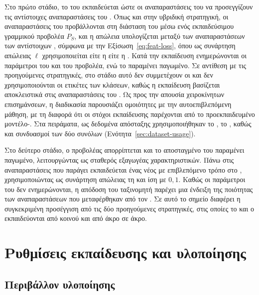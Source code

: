 Στο πρώτο στάδιο, το  του  εκπαιδεύεται ώστε οι
αναπαραστάσεις του να προσεγγίζουν τις αντίστοιχες αναπαραστάσεις του
. Όπως και στην υβριδική στρατηγική, οι
αναπαραστάσεις του  προβάλλονται στη διάσταση του
 μέσω ενός εκπαιδεύσιμου γραμμικού προβολέα \(P_S\), και η
απώλεια υπολογίζεται μεταξύ των αναπαραστάσεων των αντίστοιχων
, σύμφωνα με την Εξίσωση~\eqref{eq:feat-loss}, όπου ως συνάρτηση απώλειας \(\ell\) χρησιμοποιείται είτε η  είτε
η . Κατά την εκπαίδευση ενημερώνονται οι
παράμετροι του  και του προβολέα, ενώ το
 παραμένει παγωμένο. Σε αντίθεση με τις προηγούμενες στρατηγικές, στο στάδιο αυτό δεν
συμμετέχουν οι  και δεν χρησιμοποιούνται οι
ετικέτες των κλάσεων, καθώς η εκπαίδευση βασίζεται αποκλειστικά στις
αναπαραστάσεις του . Ως προς την απουσία χειροκίνητων
επισημάνσεων, η διαδικασία παρουσιάζει ομοιότητες με την
αυτοεπιβλεπόμενη μάθηση, με τη διαφορά ότι οι στόχοι εκπαίδευσης
παρέχονται από το προεκπαιδευμένο μοντέλο-. Στα πειράματα,
ως δεδομένα απόσταξης χρησιμοποιήθηκαν το , το ,
καθώς και συνδυασμοί των δύο συνόλων
(Ενότητα~\ref{sec:dataset-usage}).

Στο δεύτερο στάδιο, ο προβολέας απορρίπτεται και το αποσταγμένο
 του  παραμένει παγωμένο, λειτουργώντας ως
σταθερός εξαγωγέας χαρακτηριστικών. Πάνω στις αναπαραστάσεις που παράγει
εκπαιδεύεται ένας νέος  με επιβλεπόμενο τρόπο
στο , χρησιμοποιώντας ως συνάρτηση απώλειας τη
 και  ίση με \(0{,}1\). Καθώς οι παράμετροι
του  δεν ενημερώνονται, η απόδοση του ταξινομητή παρέχει
μια ένδειξη της ποιότητας των αναπαραστάσεων που μεταφέρθηκαν από τον
. Σε αυτό το σημείο διαφέρει η συγκεκριμένη προσέγγιση από
τις δύο προηγούμενες στρατηγικές, στις οποίες το  και ο
 εκπαιδεύονται από κοινού και από άκρο σε άκρο.

\section{Ρυθμίσεις εκπαίδευσης και υλοποίησης}
\label{sec:training-implementation-settings}

\subsection{Περιβάλλον υλοποίησης}

